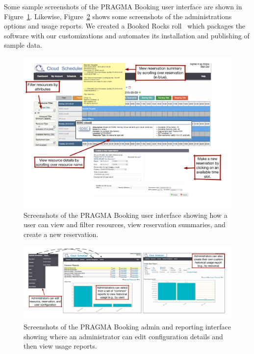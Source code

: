 \documentclass{acm_proc_article-sp}
\begin{document}
Some sample screenshots of the PRAGMA Booking user interface are shown in Figure~\ref{Fig:Booked}.  Likewise, Figure~\ref{Fig:Reports} shows some screenshots of the administrations options and usage reports.  We created a  Booked Rocks roll~\cite{cloudscheduler} which packages the software with our customizations and automates its installation and publishing of sample data.

\begin{figure}[htbp]
\begin{center}
\includegraphics[width=\textwidth]{figures/bookedReservationScreenshot.pdf}
\caption{Screenshots of the PRAGMA Booking user interface showing how a user can view and filter resources, view reservation summaries, and create a new reservation.}
\label{Fig:Booked}
\end{center}
\end{figure}

\begin{figure}[htbp]
\begin{center}
\includegraphics[width=\textwidth]{figures/bookedReportScreenshot.pdf}
\caption{Screenshots of the PRAGMA Booking admin and reporting interface showing where an administrator can edit configuration details and then view usage reports.}
\label{Fig:Reports}
\end{center}
\end{figure}
\end{document}
